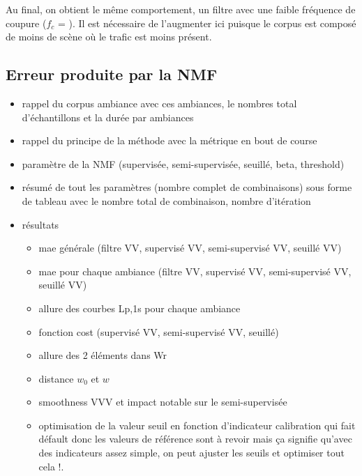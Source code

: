 Au final, on obtient le même comportement, un filtre avec une faible fréquence de coupure ($f_c$ = ). Il est nécessaire de l'augmenter ici puisque le corpus est composé de moins de scène où le trafic est moins présent.

\subsection{Erreur produite par la NMF}


\label{chap:grafic}
\begin{itemize}
\item rappel du corpus ambiance avec ces ambiances, le nombres total d'échantillons et la durée par ambiances
\item rappel du principe de la méthode avec la métrique en bout de course
\item paramètre de la NMF (supervisée, semi-supervisée, seuillé, beta, threshold)
\item résumé de tout les paramètres (nombre complet de combinaisons) sous forme de tableau avec le nombre total de combinaison, nombre d'itération
\item résultats
\begin{itemize}
\item mae générale (filtre VV, supervisé VV, semi-supervisé VV, seuillé VV)
\item mae pour chaque ambiance (filtre VV, supervisé VV, semi-supervisé VV, seuillé VV)
\item allure des courbes Lp,1s pour chaque ambiance
\item fonction cost (supervisé VV, semi-supervisé VV, seuillé)
\item allure des 2 éléments dans Wr
\item distance $w_0$ et $w$
\item smoothness VVV et impact notable sur le semi-supervisée
\item optimisation de la valeur seuil en fonction d'indicateur
calibration qui fait défault donc les valeurs de référence sont à revoir mais ça signifie qu'avec des indicateurs assez simple, on peut ajuster les seuils et optimiser tout cela !.
\end{itemize}
\end{itemize}


